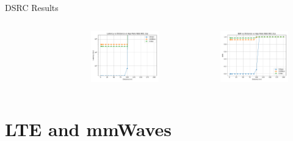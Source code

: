 \documentclass{beamer}
\begin{document}
\begin{frame}{DSRC Results}
\begin{columns}
\begin{figure}
				\end{figure}
				\begin{figure}
					\vspace{-0.2in}
					\includegraphics[scale=0.32]{latency_distance_wave_UDP}
				\end{figure}
				\begin{figure}
					\vspace{-0.3in}
					\includegraphics[scale=0.32]{BER_distance_wave_UDP}
				\end{figure}
		\end{columns}
	\end{frame}

	\section{LTE and mmWaves}
\end{document}
